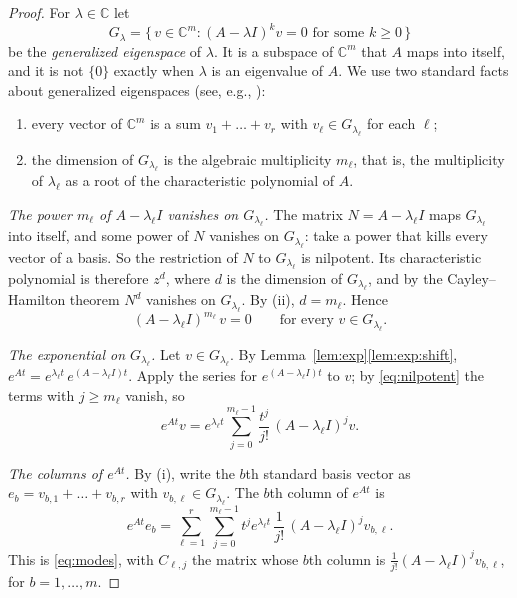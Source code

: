 \documentclass[11pt]{article}
\theoremstyle{definition}
\theoremstyle{remark}
\newcommand{\C}{\mathbb{C}}
\begin{document}
\begin{proof}
For $\lambda \in \C$ let
\[
  G_\lambda = \{\, v \in \C^{m} : (A - \lambda I)^{k} v = 0 \text{ for some } k \ge 0 \,\}
\]
be the \emph{generalized eigenspace} of $\lambda$. It is a subspace of $\C^{m}$ that $A$ maps into
itself, and it is not $\{0\}$ exactly when $\lambda$ is an eigenvalue of $A$. We use two standard
facts about generalized eigenspaces
(see, e.g., \cite[Chapter~8]{Axler}):
\begin{enumerate}[label=\textup{(\roman*)}]
  \item every vector of $\C^{m}$ is a sum $v_1 + \dots + v_r$ with $v_\ell \in G_{\lambda_\ell}$
        for each $\ell$;
  \item the dimension of $G_{\lambda_\ell}$ is the algebraic multiplicity $m_\ell$, that is, the
        multiplicity of $\lambda_\ell$ as a root of the characteristic polynomial of $A$.
\end{enumerate}

\emph{The power $m_\ell$ of $A - \lambda_\ell I$ vanishes on $G_{\lambda_\ell}$.} The matrix
$N = A - \lambda_\ell I$ maps $G_{\lambda_\ell}$ into itself, and some power of $N$ vanishes on
$G_{\lambda_\ell}$: take a power that kills every vector of a basis. So the restriction of $N$ to
$G_{\lambda_\ell}$ is nilpotent. Its characteristic polynomial is therefore $z^{d}$, where $d$ is
the dimension of $G_{\lambda_\ell}$, and by the Cayley--Hamilton theorem $N^{d}$ vanishes on
$G_{\lambda_\ell}$. By (ii), $d = m_\ell$. Hence
\begin{equation}\tag{$\ast$}\label{eq:nilpotent}
  (A - \lambda_\ell I)^{m_\ell}\, v = 0 \qquad \text{for every } v \in G_{\lambda_\ell} .
\end{equation}

\emph{The exponential on $G_{\lambda_\ell}$.} Let $v \in G_{\lambda_\ell}$. By
Lemma~\ref{lem:exp}\ref{lem:exp:shift}, $e^{At} = e^{\lambda_\ell t}\, e^{(A - \lambda_\ell I)t}$.
Apply the series for $e^{(A - \lambda_\ell I)t}$ to $v$; by \eqref{eq:nilpotent} the terms with
$j \ge m_\ell$ vanish, so
\[
  e^{At} v = e^{\lambda_\ell t} \sum_{j=0}^{m_\ell - 1} \frac{t^{j}}{j!}\, (A - \lambda_\ell I)^{j} v .
\]

\emph{The columns of $e^{At}$.} By (i), write the $b$th standard basis vector as
$e_b = v_{b,1} + \dots + v_{b,r}$ with $v_{b,\ell} \in G_{\lambda_\ell}$. The $b$th column of
$e^{At}$ is
\[
  e^{At} e_b = \sum_{\ell=1}^{r} \sum_{j=0}^{m_\ell - 1} t^{j} e^{\lambda_\ell t}\,
  \frac{1}{j!}\, (A - \lambda_\ell I)^{j} v_{b,\ell} .
\]
This is \eqref{eq:modes}, with $C_{\ell,j}$ the matrix whose $b$th column is
$\frac{1}{j!} (A - \lambda_\ell I)^{j} v_{b,\ell}$, for $b = 1, \dots, m$.
\end{proof}
\end{document}
